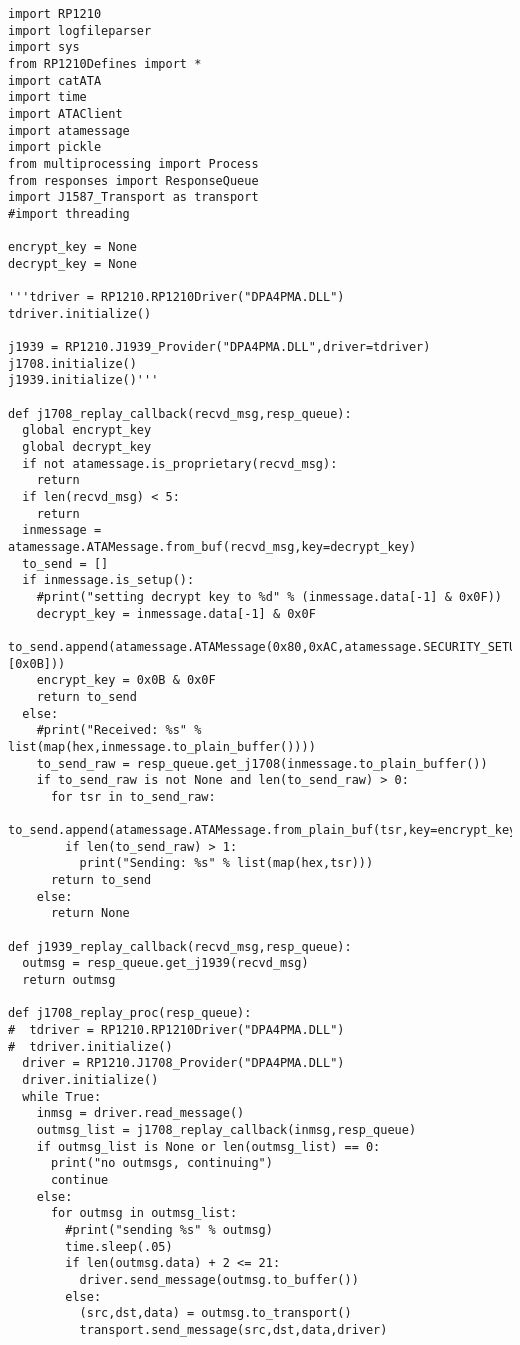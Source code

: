 \label{app:replay}
\begin{verbatim}
import RP1210
import logfileparser
import sys
from RP1210Defines import *
import catATA
import time
import ATAClient
import atamessage
import pickle
from multiprocessing import Process
from responses import ResponseQueue
import J1587_Transport as transport
#import threading

encrypt_key = None
decrypt_key = None

'''tdriver = RP1210.RP1210Driver("DPA4PMA.DLL")
tdriver.initialize()

j1939 = RP1210.J1939_Provider("DPA4PMA.DLL",driver=tdriver)
j1708.initialize()
j1939.initialize()'''

def j1708_replay_callback(recvd_msg,resp_queue):
  global encrypt_key
  global decrypt_key
  if not atamessage.is_proprietary(recvd_msg):
    return
  if len(recvd_msg) < 5:
    return
  inmessage = atamessage.ATAMessage.from_buf(recvd_msg,key=decrypt_key)
  to_send = []
  if inmessage.is_setup():
    #print("setting decrypt key to %d" % (inmessage.data[-1] & 0x0F))
    decrypt_key = inmessage.data[-1] & 0x0F
    to_send.append(atamessage.ATAMessage(0x80,0xAC,atamessage.SECURITY_SETUP,[0x0B]))
    encrypt_key = 0x0B & 0x0F
    return to_send
  else:
    #print("Received: %s" % list(map(hex,inmessage.to_plain_buffer())))
    to_send_raw = resp_queue.get_j1708(inmessage.to_plain_buffer())
    if to_send_raw is not None and len(to_send_raw) > 0:
      for tsr in to_send_raw:
        to_send.append(atamessage.ATAMessage.from_plain_buf(tsr,key=encrypt_key))
        if len(to_send_raw) > 1:
          print("Sending: %s" % list(map(hex,tsr)))
      return to_send
    else:
      return None

def j1939_replay_callback(recvd_msg,resp_queue):
  outmsg = resp_queue.get_j1939(recvd_msg)
  return outmsg

def j1708_replay_proc(resp_queue):
#  tdriver = RP1210.RP1210Driver("DPA4PMA.DLL")
#  tdriver.initialize()
  driver = RP1210.J1708_Provider("DPA4PMA.DLL")
  driver.initialize()
  while True:
    inmsg = driver.read_message()
    outmsg_list = j1708_replay_callback(inmsg,resp_queue)
    if outmsg_list is None or len(outmsg_list) == 0:
      print("no outmsgs, continuing")
      continue
    else:
      for outmsg in outmsg_list:
        #print("sending %s" % outmsg)
        time.sleep(.05)
        if len(outmsg.data) + 2 <= 21:
          driver.send_message(outmsg.to_buffer())
        else:
          (src,dst,data) = outmsg.to_transport()
          transport.send_message(src,dst,data,driver)



\end{verbatim}
